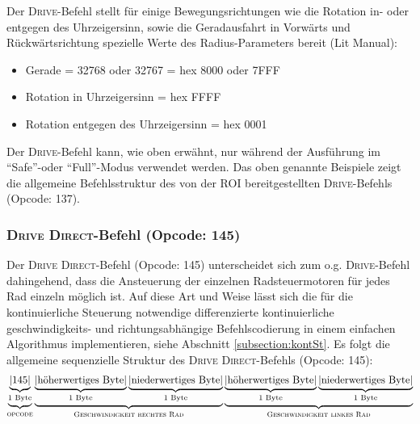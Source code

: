 Der \textsc{Drive}-Befehl stellt für einige Bewegungsrichtungen wie die Rotation in- oder entgegen des Uhrzeigersinn, sowie die Geradausfahrt in Vorwärts und Rückwärtsrichtung spezielle Werte des Radius-Parameters bereit (Lit Manual):

\begin{itemize}
  \item Gerade = 32768 oder 32767 = hex 8000 oder 7FFF
  \item Rotation in Uhrzeigersinn = hex FFFF
  \item Rotation entgegen des Uhrzeigersinn = hex 0001
\end{itemize}

Der \textsc{Drive}-Befehl kann, wie oben erwähnt, nur während der Ausführung im \enquote{Safe}-oder \enquote{Full}-Modus verwendet werden. Das oben genannte Beispiele zeigt die allgemeine Befehlsstruktur des von der ROI bereitgestellten \textsc{Drive}-Befehls (Opcode: 137). 


\subsubsection{\textsc{Drive} \textsc{Direct}-Befehl (Opcode: 145)}
Der \textsc{Drive} \textsc{Direct}-Befehl (Opcode: 145) unterscheidet sich zum o.g. \textsc{Drive}-Befehl dahingehend, dass die Ansteuerung der einzelnen Radsteuermotoren für jedes Rad einzeln möglich ist. Auf diese Art und Weise lässt sich die für die kontinuierliche Steuerung notwendige differenzierte kontinuierliche geschwindigkeits- und richtungsabhängige Befehlscodierung in einem einfachen Algorithmus implementieren, siehe Abschnitt \ref{subsection:kontSt}. Es folgt die allgemeine sequenzielle Struktur des \textsc{Drive} \textsc{Direct}-Befehls (Opcode: 145):
\begin{equation*}
\begin{split}
\underbrace{\underbrace{\text{|145|}}_{\substack{\text{\text{1 Byte}}}}}_{\substack{\text{\textsc{opcode}}}} \underbrace{\underbrace{\text{|höherwertiges Byte|}}_{\substack{\text{1 Byte}}} \underbrace{\text{|niederwertiges Byte|}}_{\substack{\text{1 Byte}}}}_{\substack{\text{\textsc{Geschwindigkeit rechtes Rad}}}} \underbrace{\underbrace{\text{|höherwertiges Byte|}}_{\substack{\text{1 Byte}}} \underbrace{\text{|niederwertiges Byte|}}_{\substack{\text{1 Byte}}}}_{\substack{\text{\textsc{Geschwindigkeit linkes Rad}}}}
\end{split}
\end{equation*}

